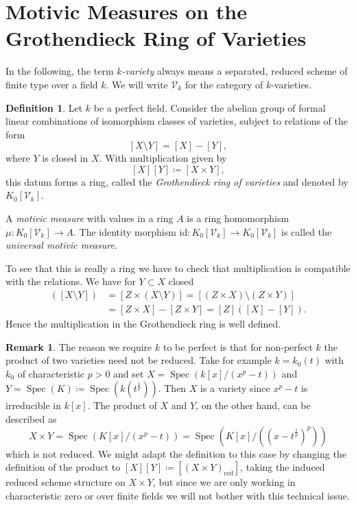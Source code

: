 \documentclass[11pt, a4paper, german, twoside]{article}
\theoremstyle{plain}
\theoremstyle{definition}
\newtheorem{definition}[theorem]{Definition}
\newtheorem{remark}[theorem]{Remark}
\newcommand{\gring}[1][k]{K_0[\mathcal{V}_#1]}
\DeclareMathOperator{\Spec}{Spec}
\begin{document}
\section{Motivic Measures on the Grothendieck Ring of Varieties}
\label{sec1}
In the following, the term \emph{$k$-variety} always means a separated, reduced scheme of finite type over a field $k$.
We will write $\mathcal{V}_k$ for the category of $k$-varieties. 

\begin{definition}
    \label{gringdef}
    Let $k$ be a perfect field. 
    Consider the abelian group of formal linear combinations of isomorphism classes of varieties, subject to relations of the form
    \[
        [X \setminus Y] = [X] - [Y],
    \] where $Y$ is closed in $X$.
    With multiplication given by
    \[
        [X][Y] \coloneqq [X \times Y],
    \]
    this datum forms a ring, called the \emph{Grothendieck ring of varieties} and denoted by $\gring$. 
    
    A \emph{motivic measure} with values in a ring $A$ is a ring homomorphism $\mu \colon \gring \to A$. The identity morphism
    $\mathrm{id} \colon \gring \to \gring$ is called the \emph{universal motivic measure}.
\end{definition}

To see that this is really a ring we have to check that multiplication is compatible with the relations. We have for $Y \subset X$ closed
\begin{align*}
    [Z] ([X \setminus Y])   &= [Z \times (X \setminus Y)] = [(Z \times X) \setminus (Z \times Y)] \\
                            &= [Z \times X] - [Z \times Y] = [Z]([X] - [Y]).
\end{align*}
Hence the multiplication in the Grothendieck ring is well defined.

\begin{remark}
The reason we require $k$ to be perfect is that for non-perfect $k$ the product of two varieties need not be reduced. Take for example
$k = k_0(t)$ with $k_0$ of characteristic $p > 0$ and set $X = \Spec(k[x]/(x^p - t))$ and $Y = \Spec(K) \coloneqq \Spec(k(t^{\frac{1}{p}}))$. 
Then $X$ is a variety since $x^p - t$ is irreducible in $k[x]$. The product of $X$ and $Y$, on the other hand, can be described as
    \[
        X \times Y = \Spec(K[x]/(x^p - t)) = \Spec(K[x]/((x-t^{\frac{1}{p}})^p))
    \]
which is not reduced. We might adapt the definition to this case by changing the definition of the product to 
$[X][Y] \coloneqq [(X \times Y)_{\text{red}}]$, taking the induced reduced scheme structure on $X \times Y$, but since we are only working
in characteristic zero or over finite fields we will not bother with this technical issue.
\end{remark}
\end{document}
